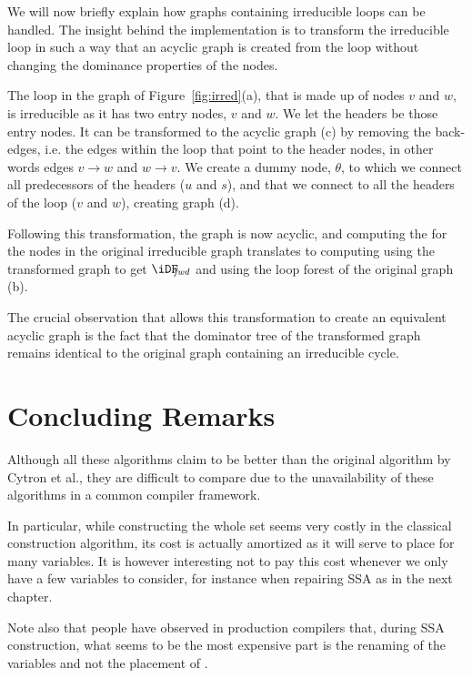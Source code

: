 {We will now briefly explain how graphs containing irreducible loops can be handled. 
The insight behind the implementation is to transform the irreducible loop in such a way that an acyclic graph is created from the loop without changing the dominance properties of the nodes.

The loop in the graph of Figure~\ref{fig:irred}(a), that is made up of nodes $v$ and $w$, is irreducible as it has two entry nodes, $v$ and $w$.
We let the headers be those entry nodes.
It can be transformed to the acyclic graph (c) by removing the back-edges, i.e. the edges within the loop that point to the header nodes, in other words edges $v\rightarrow w$ and $w\rightarrow v$. 
We create a dummy node, $\theta$, to which we connect all predecessors of the headers ($u$ and $s$), and that we connect to all the headers of the loop ($v$ and $w$), creating graph (d).

Following this transformation, the graph is now acyclic, and computing the \iDF for the nodes in the original irreducible graph translates to computing \iDF using the transformed graph to get $\iDFfwd$ and using the loop forest of the original graph (b).

The crucial observation that allows this transformation to create an equivalent acyclic graph is the fact that the dominator tree of the transformed graph remains identical to the original graph containing an irreducible cycle. 

\section{Concluding Remarks}

Although all these algorithms claim to be better than the original algorithm by Cytron et al., they are difficult to compare due to the unavailability of these algorithms in a common compiler framework. 

In particular, while constructing the whole \iDF set seems very costly in the classical construction algorithm, its cost is actually amortized as it will serve to place \phifuns for many variables.
It is however interesting not to pay this cost whenever we only have a few variables to consider, for instance when repairing SSA as in the next chapter.
 
Note also that people have observed in production compilers that, during SSA construction, what seems to be the most expensive part is the renaming of the variables and not the placement of \phifuns.



}
